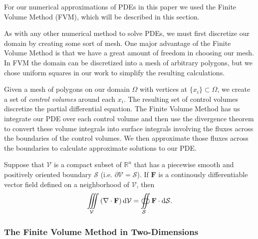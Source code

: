 For our numerical approximations of PDEs in this paper we used the Finite Volume Method (FVM), which will be described in this section.

As with any other numerical method to solve PDEs, we must first discretize our domain by creating some sort of mesh. One major advantage of the Finite Volume Method is that we have a great amount of freedom in choosing our mesh. In FVM the domain can be discretized into a mesh of arbitrary polygons, but we chose uniform squares in our work to simplify the resulting calculations.

Given a mesh of polygons on our domain $\Omega$ with vertices at $\lbrace x_i\rbrace\subset\Omega$, we create a set of {\color{baystate}\textit{control volumes}} around each $x_i$. The resulting set of control volumes discretize the partial differential equation. The Finite Volume Method has us integrate our PDE over each control volume and then use the divergence theorem to convert these volume integrals into surface integrals involving the fluxes across the boundaries of the control volumes. We then approximate those fluxes across the boundaries to calculate approximate solutions to our PDE.

\begin{thm}
	Suppose that $\mathcal{V}$ is a compact subset of $\mathbb{R}^n$ that has a piecewise smooth and positively oriented boundary $\mathcal{S}$ (i.e. $\partial\mathcal{V}=\mathcal{S}$). If $\mathbf{F}$ is a continously differentiable vector field defined on a neighborhood of $\mathcal{V}$, then
	\begin{equation}
		\iiint\limits_{\mathcal{V}}\left(\nabla\cdot\mathbf{F}\right)\dif\mathcal{V}=\oiint\limits_{\mathcal{S}}\mathbf{F}\cdot\dif\mathcal{S}.\label{eqn:div-thm}
	\end{equation}
	\label{thm:div-thm}
\end{thm}

\subsubsection{The Finite Volume Method in Two-Dimensions}

